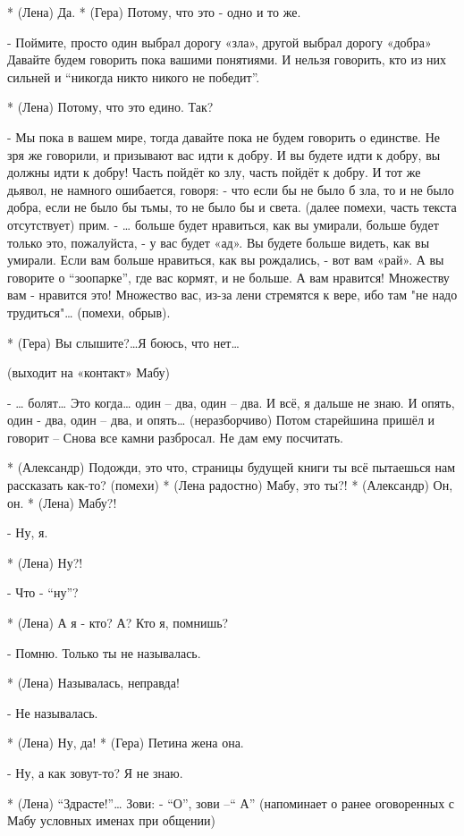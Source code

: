* (Лена) Да.
* (Гера) Потому, что это - одно и то же.

- Поймите, просто один выбрал дорогу «зла», другой выбрал дорогу «добра» Давайте будем говорить пока вашими понятиями. И нельзя говорить, кто из них сильней и “никогда никто никого не победит”.

* (Лена) Потому, что это едино. Так?

- Мы пока в вашем мире, тогда давайте пока не будем говорить о единстве. Не зря же говорили, и призывают вас идти к добру. И вы будете идти к добру, вы должны идти к добру! Часть пойдёт ко злу, часть пойдёт к добру. И тот же дьявол, не намного ошибается, говоря: - что если бы не было б зла, то и не было  добра, если не было бы тьмы, то не было бы и света. (далее помехи, часть текста отсутствует) прим.
- … больше будет нравиться, как вы умирали, больше будет только это, пожалуйста, - у вас будет «ад». Вы будете больше видеть, как вы умирали. Если вам больше нравиться, как вы рождались, - вот вам «рай». А вы говорите о “зоопарке”, где вас кормят, и не больше. А вам нравится! Множеству вам - нравится это! Множество вас, из-за лени стремятся к вере, ибо там "не надо трудиться"… (помехи, обрыв).

* (Гера) Вы слышите?…Я боюсь, что нет…

(выходит на «контакт» Мабу)

- … болят… Это когда… один – два, один – два. И всё, я дальше не знаю. И опять, один - два, один – два, и опять… (неразборчиво) Потом старейшина пришёл и говорит – Снова все камни разбросал. Не дам ему посчитать.

* (Александр) Подожди, это что, страницы будущей книги ты всё пытаешься нам рассказать как-то? (помехи)
* (Лена радостно) Мабу, это ты?!
* (Александр) Он, он.
* (Лена) Мабу?!

- Ну, я.

* (Лена) Ну?!

- Что - “ну”?

* (Лена) А я - кто? А? Кто я, помнишь?

- Помню. Только ты не называлась.

* (Лена) Называлась, неправда!

- Не называлась.

* (Лена) Ну, да!
* (Гера) Петина жена она.

- Ну, а как зовут-то?  Я не знаю.

* (Лена) “Здрасте!”… Зови: - “О”, зови –“ А” (напоминает о ранее оговоренных с Мабу условных именах при общении)


